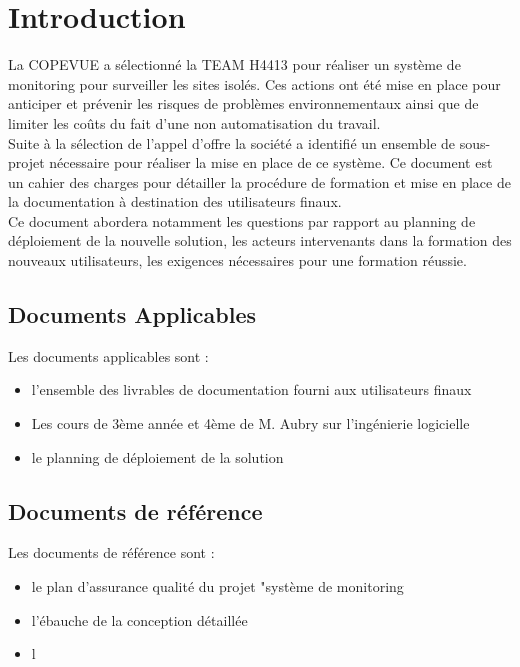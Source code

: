 \section{Introduction}

La COPEVUE a sélectionné la TEAM H4413 pour réaliser un système de monitoring pour 
surveiller les sites isolés. Ces actions ont été mise en place pour anticiper et prévenir
les risques de problèmes environnementaux ainsi que de limiter les coûts du fait
d'une non automatisation du travail. 
\\
Suite à la sélection de l'appel d'offre la société a identifié un ensemble de sous-projet
nécessaire pour réaliser la mise en place de ce système. Ce document est un cahier des charges
pour détailler la procédure de formation et mise en place de la documentation à destination des 
utilisateurs finaux. 
\\
Ce document abordera notamment les questions par rapport au planning de déploiement 
de la nouvelle solution, les acteurs intervenants dans la formation des nouveaux 
utilisateurs, les exigences nécessaires pour une formation réussie.


\subsection{Documents Applicables}

Les documents applicables sont :
\begin{itemize}
\item l'ensemble des livrables de documentation fourni aux utilisateurs finaux
\item Les cours de 3ème année et 4ème de M. Aubry sur l'ingénierie logicielle
\item le planning de déploiement de la solution
\end{itemize}

\subsection{Documents de référence}

Les documents de référence sont : 
\begin{itemize}
\item le plan d'assurance qualité du projet "système de monitoring
\item l'ébauche de la conception détaillée
\item l
\end{itemize}

